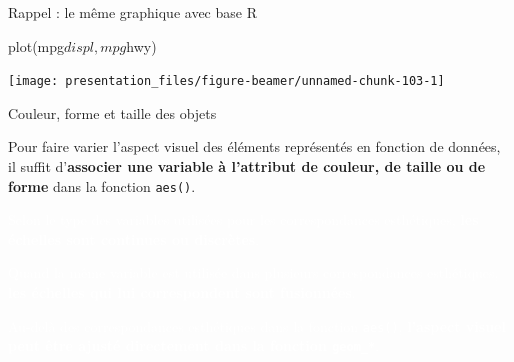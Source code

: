 \documentclass[12pt,ignorenonframetext,handout,]{beamer}
\newenvironment{Shaded}{}{}
\newcommand{\KeywordTok}[1]{\textcolor[rgb]{0.00,0.00,1.00}{#1}}
\newcommand{\NormalTok}[1]{#1}
\newcommand{\OperatorTok}[1]{#1}
\renewenvironment{Shaded}{\begin{snugshade}}{\end{snugshade}}
\begin{document}
\begin{frame}[fragile]{\large Rappel : le même graphique avec base R}
\protect\hypertarget{rappel-le-meme-graphique-avec-base-r}{}

\centering \footnotesize

\begin{Shaded}
\begin{Highlighting}[]
\KeywordTok{plot}\NormalTok{(mpg}\OperatorTok{$}\NormalTok{displ, mpg}\OperatorTok{$}\NormalTok{hwy)}
\end{Highlighting}
\end{Shaded}

\texttt{[image: presentation\_files/figure-beamer/unnamed-chunk-103-1]}

\end{frame}

\begin{frame}{Couleur, forme et taille des objets}
\protect\hypertarget{couleur-forme-et-taille-des-objets-3}{}

Pour faire varier l’aspect visuel des éléments représentés en fonction
de données, il suffit
d’\textbf{associer une variable à l'attribut de couleur, de taille ou de forme}
dans la fonction \texttt{aes()}.

\textcolor{white}{Selon le type des variables utilisées pour les correspondances esthétiques, \textbf{les échelles sont continues ou discrètes}.}

\textcolor{white}{Quand la même variable est utilisée dans plusieurs correspondances esthétiques, \textbf{les échelles qui lui correspondent sont fusionnées}.}

\textcolor{white}{Au-delà des correspondances esthétiques dans la fonction \texttt{aes()}, \textbf{l'aspect visuel peut être ajusté directement dans la fonction \texttt{geom\_*}}.}

\end{frame}
\end{document}
